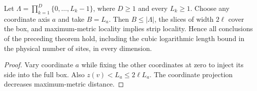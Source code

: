 \begin{lemma}
    \label{cor:hastings05_coordinate_slice_boxes}
    \leanok
    Let $\Lambda=\prod_{k=1}^D\{0,\ldots,L_k-1\}$, where $D\ge1$ and
    every $L_k\ge1$. Choose any coordinate axis $a$ and take $B=L_a$.
    Then $B\le|\Lambda|$, the slices of width $2\ell$ cover the box, and
    maximum-metric locality implies strip locality. Hence all conclusions
    of the preceding theorem hold, including the cubic logarithmic length
    bound in the physical number of sites, in every dimension.
\end{lemma}
\begin{proof}\leanok
    Vary coordinate $a$ while fixing the other coordinates at zero to
    inject its side into the full box. Also $z(v)<L_a\le2\ell L_a$.
    The coordinate projection decreases maximum-metric distance.
\end{proof}
